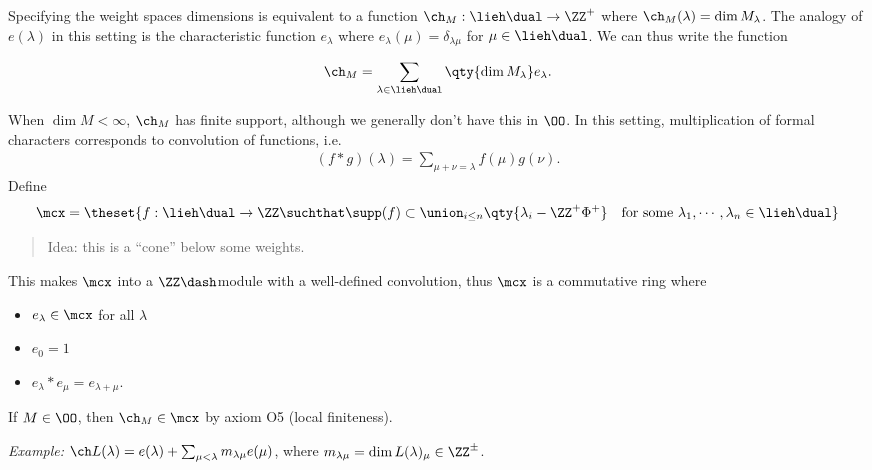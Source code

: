 Specifying the weight spaces dimensions is equivalent to a function
\(\ch_M: \lieh\dual \to \ZZ^+\) where
\(\ch_M(\lambda) = \dim M_\lambda\). The analogy of \(e(\lambda)\) in
this setting is the characteristic function \(e_\lambda\) where
\(e_\lambda(\mu) = \delta_{\lambda \mu}\) for \(\mu \in \lieh\dual\). We
can thus write the function

\begin{align*}
\ch_M = \sum_{\lambda \in \lieh\dual} \qty{ \dim M_\lambda } e_\lambda
.\end{align*}

When \(\dim M < \infty\), \(\ch_M\) has finite support, although we
generally don't have this in \(\OO\). In this setting, multiplication of
formal characters corresponds to convolution of functions, i.e.~
\begin{align*}(f\ast g)(\lambda) = \sum_{\mu + \nu = \lambda} f(\mu) g(\nu).\end{align*}
Define
\begin{align*}
\mcx = \theset{f: \lieh\dual \to \ZZ \suchthat \supp(f) \subset \union_{i\leq n} \qty{ \lambda_i - \ZZ^+ \Phi^+  }  ~~\text{ for some } \lambda_1, \cdots, \lambda_n \in \lieh\dual }
\end{align*}

\begin{quote}
Idea: this is a ``cone'' below some weights.
\end{quote}

This makes \(\mcx\) into a \(\ZZ\dash\)module with a well-defined
convolution, thus \(\mcx\) is a commutative ring where

\begin{itemize}
\tightlist
\item
  \(e_\lambda \in \mcx\) for all \(\lambda\)
\item
  \(e_0 = 1\)
\item
  \(e_\lambda \ast e_\mu = e_{\lambda + \mu}\).
\end{itemize}

If \(M\in \OO\), then \(\ch_M \in \mcx\) by axiom O5 (local finiteness).

\emph{Example:}
\(\ch L(\lambda) = e(\lambda) + \sum_{\mu < \lambda} m_{\lambda \mu} e(\mu)\),
where \(m_{\lambda \mu} = \dim L(\lambda)_{\mu} \in \ZZ^\pm\).

